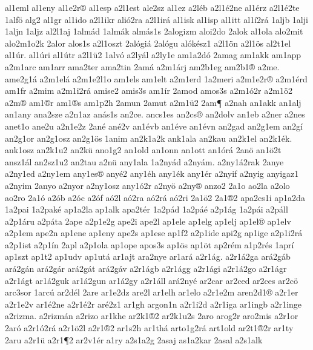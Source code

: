 {al1eml
al1eny
al1e2r^^ae
al1esp
a2l1est
ale2sz
al1ez
a2l^^e9b
a2l1^^e92ne
al1^^e9rz
a2l1^^e92te
1alf^^f6
alg2
al1gr
al1ido
a2l1ikr
ali^^f32ra
a2l1ir^^e1
al1isk
al1isp
al1itt
al1^^ed2r^^e1
1aljb
1alji
1aljn
1aljz
al2l1aj
1alm^^e1d
1alm^^e1k
alm^^e1s1s
2alogizm
aloi2do
2alok
al1ola
alo2mit
alo2m1o2k
2alor
alos1s
a2l1oszt
2al^^f3gi^^e1
2al^^f3gu
al^^f3k^^e9sz1
a2l1^^f6n
a2l1^^f6s
al2t1el
al1^^far.
al1^^fari
al1^^fatr
a2l1^^fc2
1alv^^f3
a2ly^^e1l
a2ly1e
am1a2d^^f3
2amag
am1akk
am1app
a2m1arc
am1arr
ama2ter
ama2tin
2am^^e1
a2m1^^e1rj
am2b1eg
am2b1^^ae
a2me.
ame2g1^^e1
a2m1el^^e1
a2m1e2l1o
am1els
am1elt
a2m1erd
1a2meri
a2m1e2r^^ae
a2m1^^e9rd
am1fr
a2mim
a2m1i2r^^e1
amise2
amis3s
am1^^edr
2amod
amos3s
a2m1^^f32r
a2m1^^f62
a2m^^ae
am1^^aer
am1^^aes
am1p2h
2amun
2amut
a2m1^^fc2
2am^^b6
a2nah
an1akk
an1alj
an1any
ana2sze
a2n1az
an^^e1s1s
an2ce.
ancs1es
an2cs^^ae
an2dolv
an1eb
a2ner
a2nes
anet1o
ane2u
a2n1e2z
2an^^e9
an^^e92v
an1^^e9vb
an1^^e9ve
an1^^e9vn
an2gad
an2g1em
an2g^^ed
an2g1or
an2g1osz
an2g1^^f6s
1anim
an2k1a2k
ank1ala
an2kau
an2k1el
an2k1^^e9k.
ank1osz
an2k1u2
an2k^^fc
ano1g2
an1old
an1onn
an1ott
an1^^f3r^^e1
2an^^f6
an1^^f62t
ansz1^^e1l
an2sz1u2
an2tau
a2n^^fc
any1ala
1a2ny^^e1d
a2ny^^e1m.
a2ny1^^e12rak
2anye
a2ny1ed
a2ny1em
any1es^^ae
any^^e92
any1^^e9h
any1^^e9k
any1^^e9r
a2nyif
a2nyig
anyigaz1
a2nyim
2anyo
a2nyor
a2ny1osz
any1^^f32r
a2ny^^f6
a2ny^^ae
anzo2
2a1o
ao2la
a2olo
ao2ro
2a1^^f3
a2^^f3b
a2^^f3c
a2^^f3f
a^^f32l
a^^f32ra
a^^f32r^^e1
a^^f32ri
2a1^^f62
2a1^^ae2
apa2cs1i
ap1a2da
1a2pai
1a2pak^^e9
ap1a2la
ap1alk
apa2t^^e9r
1a2p^^e1d
1a2p^^e1^^e9
a2p1^^e1g
1a2p^^e1i
a2p^^e1ll
a2p1^^e1ru
a2p^^e1ta
2ape
a2p1e2g
ape2i
ape2l
ap1ele
ap1elg
ap1elj
ap1el^^ae
ap1elv
a2p1em
ape2n
ap1ene
ap1eny
ape2s
ap1ese
ap1f2
a2p1ide
api2g
ap1ige
a2p1i2r^^e1
a2p1ist
a2p1^^edn
2apl
a2p1ola
ap1ope
apos3s
ap1^^f6s
ap1^^f6t
ap2r^^e9m
a1p2r^^e9s
1apr^^ed
ap1szt
ap1t2
ap1udv
ap1ut^^e1
ar1ajt
ara2nye
ar1ar^^e1
a2r1^^e1g.
a2r1^^e12ga
ar^^e12g^^e1b
ar^^e12g^^e1n
ar^^e12g^^e1r
ar^^e12g^^e1t
ar^^e12g^^e1v
a2r1^^e1gb
a2r1^^e1gg
a2r1^^e1gi
a2r1^^e12go
a2r1^^e1gr
a2r1^^e1gt
ar1^^e12guk
ar1^^e12gun
ar1^^e12gy
a2r1^^e1ll
ar^^e12ny^^e9
ar2car
ar2ced
ar2ces
ar2c^^f6
arc3sor
1arc^^fa
ar2d^^e9l
2are
ar1e2dz
are2l
ar1elh
ar1elo
a2r1e2m
aren2d1^^ae
a2r1er
a2r1e2v
ar1^^e92ne
a2r1^^e92r
ar^^e92z1
ar1gh
argon1n
a2r1i2d
a2r1iga
ar1ingb
a2r1inge
a2rizma.
a2rizm^^e1n
a2rizo
ar1khe
ar2k1^^ae2
ar2k1u2s
2aro
arog2r
aro2mis
a2r1or
2ar^^f3
a2r1^^f32r^^e1
a2r1^^f62l
a2r1^^ae2
ar1s2h
ar1th^^e1
arto1g2r^^e1
art1old
ar2t1^^ae2r
ar1ty
2aru
a2r1^^fc
a2r1^^b62
ar2v1^^e9r
a1ry
a2s1a2g
2asaj
as1a2kar
2asal
a2s1alk
}
